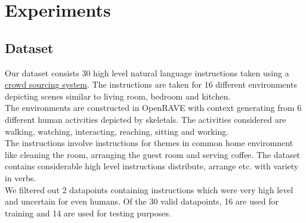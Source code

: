 \section{Experiments}
\subsection{Dataset}
Our dataset consists 30 high level natural language instructions taken using a \href{http://52.25.65.189:9000/#/getFeedback}{crowd sourcing system}. The instructions are taken for 16 different environments depicting scenes similar to living room, bedroom and kitchen. \\
The environments are constructed in OpenRAVE with context generating from 6 different human activities depicted by skeletals. The activities considered are walking, watching, interacting, reaching, sitting and working. \\
The instructions involve instructions for themes in common home enviromnent like cleaning the room, arranging the guest room and serving coffee. The dataset contains considerable high level instructions distribute, arrange etc. with variety in verbs.\\
We filtered out 2 datapoints containing instructions which were very high level and uncertain for even  humans. Of the 30 valid datapoints, 16 are used for training and 14 are used for testing purposes.  
